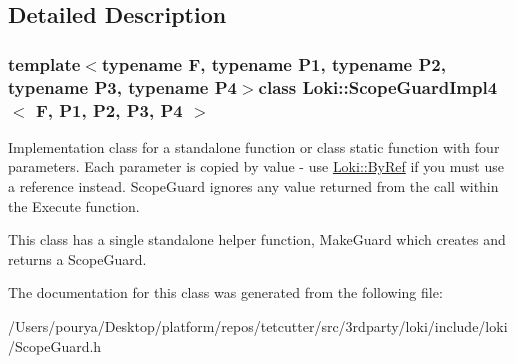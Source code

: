 \subsection{Detailed Description}
\subsubsection*{template$<$typename F, typename P1, typename P2, typename P3, typename P4$>$class Loki\+::\+Scope\+Guard\+Impl4$<$ F, P1, P2, P3, P4 $>$}

Implementation class for a standalone function or class static function with four parameters. Each parameter is copied by value -\/ use \hyperlink{group__ExceptionGroup_ga0a94ba0342e6abcdb8f9b32ed5ad7e3d}{Loki\+::\+By\+Ref} if you must use a reference instead. Scope\+Guard ignores any value returned from the call within the Execute function.

This class has a single standalone helper function, Make\+Guard which creates and returns a Scope\+Guard. 

The documentation for this class was generated from the following file\+:\begin{DoxyCompactItemize}
\item 
/\+Users/pourya/\+Desktop/platform/repos/tetcutter/src/3rdparty/loki/include/loki/Scope\+Guard.\+h\end{DoxyCompactItemize}
